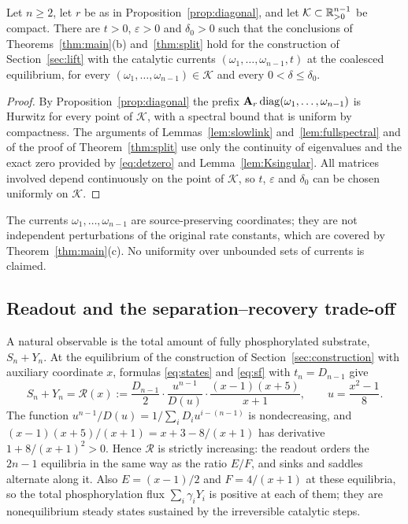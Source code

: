 \begin{corollary}\label{cor:currents}
Let \(n\ge2\), let \(r\) be as in Proposition~\ref{prop:diagonal}, and let
\(\mathcal K\subset\mathbb R^{n-1}_{>0}\) be compact. There are \(t>0\), \(\varepsilon>0\) and
\(\delta_0>0\) such that the conclusions of Theorems~\ref{thm:main}\textup{(b)}
and~\ref{thm:split} hold for the construction of Section~\ref{sec:lift} with the catalytic
currents \((\omega_1,\dots,\omega_{n-1},t)\) at the coalesced equilibrium, for every
\((\omega_1,\dots,\omega_{n-1})\in\mathcal K\) and every \(0<\delta\le\delta_0\).
\end{corollary}
\begin{proof}
By Proposition~\ref{prop:diagonal} the prefix \(\mathbf A_r\operatorname{diag}(\omega_1,\dots,\omega_{n-1})\) is
Hurwitz for every point of \(\mathcal K\), with a spectral bound that is uniform by
compactness. The arguments of Lemmas~\ref{lem:slowlink} and~\ref{lem:fullspectral} and of the
proof of Theorem~\ref{thm:split} use only the continuity of eigenvalues and the exact zero
provided by \eqref{eq:detzero} and Lemma~\ref{lem:Ksingular}. All matrices involved depend
continuously on the point of \(\mathcal K\), so \(t\), \(\varepsilon\) and \(\delta_0\) can be
chosen uniformly on \(\mathcal K\).
\end{proof}

The currents \(\omega_1,\dots,\omega_{n-1}\) are source-preserving coordinates; they are not
independent perturbations of the original rate constants, which are covered by
Theorem~\ref{thm:main}(c). No uniformity over unbounded sets of currents is claimed.

\subsection{Readout and the separation--recovery trade-off}
A natural observable is the total amount of fully phosphorylated substrate, \(S_n+Y_n\). At the
equilibrium of the construction of Section~\ref{sec:construction} with auxiliary coordinate
\(x\), formulas \eqref{eq:states} and \eqref{eq:sf} with \(t_n=D_{n-1}\) give
\begin{equation}\label{eq:readout}
 S_n+Y_n=\mathcal R(x):=\frac{D_{n-1}}{2}\cdot\frac{u^{n-1}}{D(u)}\cdot\frac{(x-1)(x+5)}{x+1},
 \qquad u=\frac{x^2-1}{8}.
\end{equation}
The function \(u^{n-1}/D(u)=1/\sum_iD_iu^{i-(n-1)}\) is nondecreasing, and
\((x-1)(x+5)/(x+1)=x+3-8/(x+1)\) has derivative \(1+8/(x+1)^2>0\). Hence \(\mathcal R\) is
strictly increasing: the readout orders the \(2n-1\) equilibria in the same way as the ratio
\(E/F\), and sinks and saddles alternate along it. Also \(E=(x-1)/2\) and \(F=4/(x+1)\) at these
equilibria, so the total phosphorylation flux \(\sum_i\gamma_iY_i\) is positive at each of
them; they are nonequilibrium steady states sustained by the irreversible catalytic steps.

